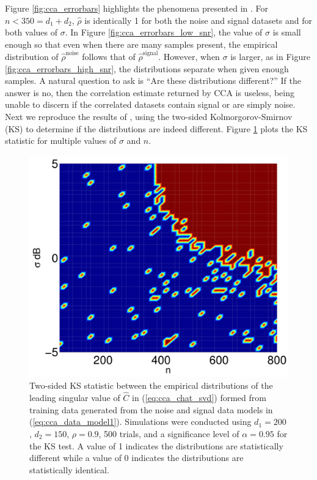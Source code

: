 Figure \ref{fig:cca_errorbars} highlights the phenomena presented in
\cite{pezeshki2004empirical}. For $n<350=d_1+d_2$, $\widehat{\rho}$ is identically 1 for
both the noise and signal datasets and for both values of $\sigma$. In Figure
\ref{fig:cca_errorbars_low_snr}, the value of $\sigma$ is small enough so that even when
there are many samples present, the empirical distribution of
$\widehat{\rho}^{\text{noise}}$ follows that of $\widehat{\rho}^{\text{signal}}$. However,
when $\sigma$ is larger, as in Figure \ref{fig:cca_errorbars_high_snr}, the distributions
separate when given enough samples. A natural question to ask is ``Are these distributions
different?'' If the answer is no, then the correlation estimate returned by CCA is
useless, being unable to discern if the correlated datasets contain signal or are simply
noise. Next we reproduce the results of \cite{nadakuditi2011fundamental}, using the
two-sided Kolmorgorov-Smirnov (KS) to determine if the distributions are indeed
different. Figure \ref{fig:cca_ks_heatmap} plots the KS statistic for multiple values of
$\sigma$ and $n$.

\begin{figure}
  \centering\includegraphics[width=\figwidth]{figures/cca_ks_heatmap.pdf}
  \caption{Two-sided KS statistic between the empirical distributions of the leading
    singular value of $\widehat{C}$ in (\ref{eq:cca_chat_svd}) formed from training data
    generated from the noise and signal data models in (\ref{eq:cca_data_model1}).
    Simulations were conducted using $d_1=200$, $d_2=150$, $\rho=0.9$, 500 trials, and a
    significance level of $\alpha=0.95$ for the KS test. A value of 1 indicates the
    distributions are statistically different while a value of 0 indicates the
    distributions are statistically identical.}
  \label{fig:cca_ks_heatmap}
\end{figure}

